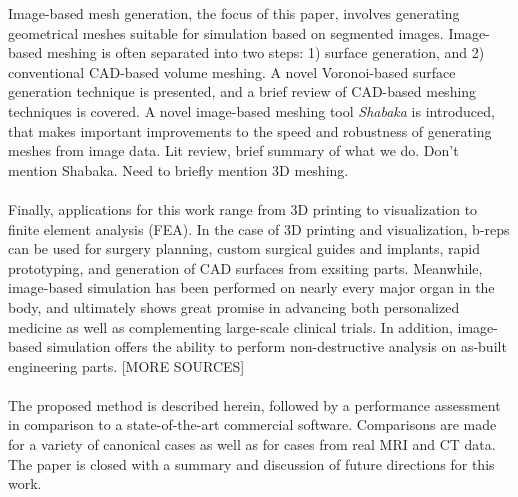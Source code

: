 %
Image-based mesh generation, the focus of this paper, involves generating geometrical meshes suitable for simulation based on segmented images. Image-based meshing is often separated into two steps: 1) surface generation,  and 2) conventional CAD-based volume meshing. A novel Voronoi-based surface generation technique is presented, and a brief review of CAD-based meshing techniques is covered. A novel image-based meshing tool \textit{Shabaka} is introduced, that makes important improvements to the speed and robustness of generating meshes from image data. Lit review, brief summary of what we do. Don't mention Shabaka. Need to briefly mention 3D meshing. \\ \\
%
Finally, applications for this work range from 3D printing to visualization to finite element analysis (FEA). In the case of 3D printing and visualization, b-reps can be used for surgery planning, custom surgical guides and implants, rapid prototyping, and generation of CAD surfaces from exsiting parts. Meanwhile, image-based simulation has been performed on nearly every major organ in the body, and ultimately shows great promise in advancing both personalized medicine as well as complementing large-scale clinical trials. In addition, image-based simulation offers the ability to perform non-destructive analysis on as-built engineering parts. [MORE SOURCES]\\ \\
%
The proposed method is described herein, followed by a performance assessment in comparison to a state-of-the-art commercial software. Comparisons are made for a variety of canonical cases as well as for cases from real MRI and CT data. The paper is closed with a summary and discussion of future directions for this work.
